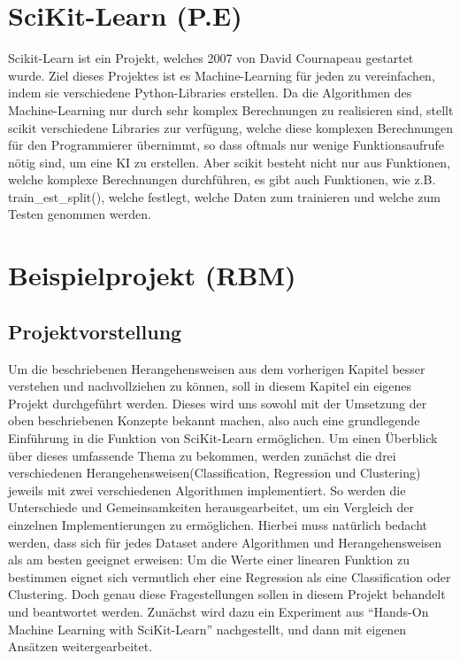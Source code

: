 \chapter{SciKit-Learn (P.E)}
\label{chap:sciKitLearn}
Scikit-Learn ist ein Projekt, welches 2007 von David Cournapeau gestartet wurde\cite{SKL}. Ziel dieses Projektes ist es Machine-Learning für jeden zu vereinfachen, indem sie verschiedene Python-Libraries erstellen. Da die Algorithmen des Machine-Learning nur durch sehr komplex Berechnungen zu realisieren sind, stellt scikit verschiedene Libraries zur verfügung, welche diese komplexen Berechnungen für den Programmierer übernimmt, so dass oftmals nur wenige Funktionsaufrufe nötig sind, um eine KI zu erstellen. Aber scikit besteht nicht nur aus Funktionen, welche komplexe Berechnungen durchführen, es gibt auch Funktionen, wie z.B. train\_est\_split(), welche festlegt, welche Daten zum trainieren und welche zum Testen genommen werden.

\chapter{Beispielprojekt (RBM)}
\label{chap:Beispielprojekt}

\section{Projektvorstellung}
\label{sec:projektvorstellung}
Um die beschriebenen Herangehensweisen aus dem vorherigen Kapitel besser verstehen und nachvollziehen zu können, soll in diesem Kapitel ein eigenes Projekt durchgeführt werden. Dieses wird uns sowohl mit der Umsetzung der oben beschriebenen Konzepte bekannt machen, also auch eine grundlegende Einführung in die Funktion von SciKit-Learn ermöglichen. 
Um einen Überblick über dieses umfassende Thema zu bekommen, werden zunächst die drei verschiedenen Herangehensweisen(Classification, Regression und Clustering) jeweils mit zwei verschiedenen Algorithmen implementiert. So werden die Unterschiede und Gemeinsamkeiten herausgearbeitet, um ein Vergleich der einzelnen Implementierungen zu ermöglichen. Hierbei muss natürlich bedacht werden, dass sich für jedes Dataset andere Algorithmen und Herangehensweisen als am besten geeignet erweisen: Um die Werte einer linearen Funktion zu bestimmen eignet sich vermutlich eher eine Regression als eine Classification oder Clustering. Doch genau diese Fragestellungen sollen in diesem Projekt behandelt und beantwortet werden.
Zunächst wird dazu ein Experiment aus “Hands-On Machine Learning with SciKit-Learn” nachgestellt, und dann mit eigenen Ansätzen weitergearbeitet.

